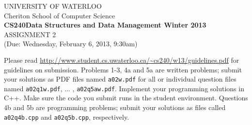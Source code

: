 \documentclass[11pt]{article}
\begin{document}
%
%
\begin{center}
UNIVERSITY OF WATERLOO\\
Cheriton School of Computer Science\\[\baselineskip]
{\bf CS240\hfill Data Structures and Data Management \hfill
Winter 2013}\\[\baselineskip]
{\sc \large ASSIGNMENT 2}\\
(Due: Wednesday, February 6, 2013, 9:30am)\\[2\baselineskip]
\end{center}
%
%

\noindent
Please read \url{http://www.student.cs.uwaterloo.ca/~cs240/w13/guidelines.pdf} for
guidelines on submission. Problems 1-3, 4a and 5a are written problems; submit your solutions as PDF files named {\tt a02w.pdf} for all or individual question files named {\tt a02q1w.pdf}, ... , {\tt a02q5aw.pdf}. Implement your programming solutions in C++. Make sure the code you submit runs in the student environment. Questions 4b and 5b are programming problems; submit your solutions as files called {\tt a02q4b.cpp} and {\tt a02q5b.cpp}, respectively.
\noindent
\end{document}
